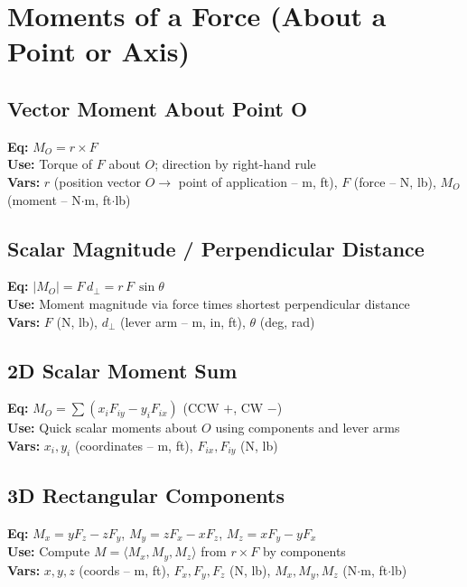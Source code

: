 \documentclass[10pt]{article}
\begin{document}
\section{Moments of a Force (About a Point or Axis)}
\begin{multicols}{2}
    \subsection{Vector Moment About Point O}
    \textbf{Eq:} $M_O = r \times F$\\
    \textbf{Use:} Torque of $F$ about $O$; direction by right-hand rule\\
    \textbf{Vars:} $r$ (position vector $O\!\to$ point of application -- m, ft), $F$ (force -- N, lb), $M_O$ (moment -- N$\cdot$m, ft$\cdot$lb)\\[2pt]

    \subsection{Scalar Magnitude / Perpendicular Distance}
    \textbf{Eq:} $|M_O| = F\,d_{\perp} = r\,F\,\sin\theta$\\
    \textbf{Use:} Moment magnitude via force times shortest perpendicular distance\\
    \textbf{Vars:} $F$ (N, lb), $d_{\perp}$ (lever arm -- m, in, ft), $\theta$ (deg, rad)\\[2pt]

    \subsection{2D Scalar Moment Sum}
    \textbf{Eq:} $M_O = \sum\!\left(x_i F_{iy} - y_i F_{ix}\right)$ \; (CCW $+$, CW $-$)\\
    \textbf{Use:} Quick scalar moments about $O$ using components and lever arms\\
    \textbf{Vars:} $x_i,y_i$ (coordinates -- m, ft), $F_{ix},F_{iy}$ (N, lb)\\[2pt]

    \subsection{3D Rectangular Components}
    \textbf{Eq:} $M_x = yF_z - zF_y$, \; $M_y = zF_x - xF_z$, \; $M_z = xF_y - yF_x$\\
    \textbf{Use:} Compute $M=\langle M_x,M_y,M_z\rangle$ from $r\times F$ by components\\
    \textbf{Vars:} $x,y,z$ (coords -- m, ft), $F_x,F_y,F_z$ (N, lb), $M_x,M_y,M_z$ (N$\cdot$m, ft$\cdot$lb)\\[2pt]


\end{multicols}
\end{document}
